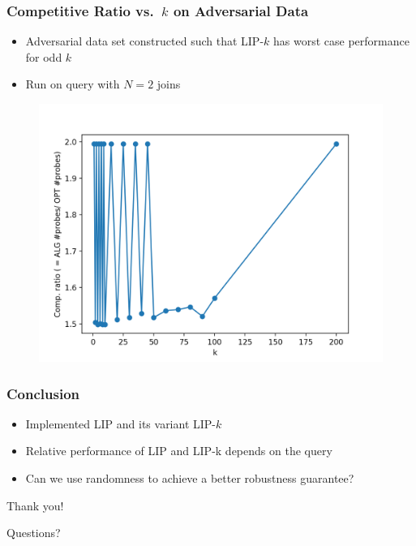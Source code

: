 \documentclass{beamer}
\begin{document}
\begin{frame}
  \frametitle{Competitive Ratio vs.\ $k$ on Adversarial Data}
  \begin{itemize}
      \item Adversarial data set constructed such that LIP-$k$ has worst case performance for odd $k$
      \item Run on query with $N = 2$ joins
  \end{itemize}
  \begin{figure}
    \centering
    \includegraphics[height=0.7\textheight,keepaspectratio]{cr-k-skewed}
  \end{figure}
\end{frame}



\begin{frame}
\frametitle{Conclusion}

  \begin{itemize}
    \item Implemented LIP and its variant LIP-$k$
    \item Relative performance of LIP and LIP-k depends on the query 
    \item Can we use randomness to achieve a better robustness guarantee?
  \end{itemize}
\end{frame}


\begin{frame}
\Huge{Thank you!}
\end{frame}

\begin{frame}
\Huge{Questions?}
\end{frame}
\end{document}
